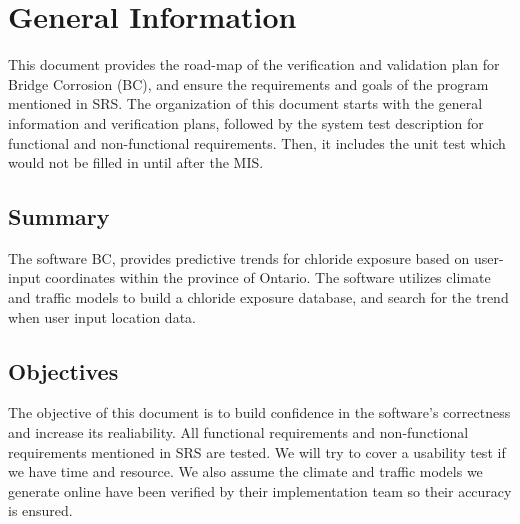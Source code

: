\documentclass[12pt, titlepage]{article}
\begin{document}


\newpage


\section{General Information}

This document provides the road-map of the verification and validation plan for Bridge Corrosion (BC), and ensure the requirements and goals of the program mentioned in SRS. The organization of this document starts with the general information and verification plans, followed by the system test description for functional and non-functional requirements. Then, it includes the unit test which would not be filled in until after the MIS.

\subsection{Summary}

The software BC, provides predictive trends for chloride exposure based on user-input coordinates within the province of Ontario. The software utilizes climate and traffic models to build a chloride exposure database, and search for the trend when user input location data.

\subsection{Objectives}
The objective of this document is to build confidence in the software's correctness and increase its realiability. All functional requirements and non-functional requirements mentioned in SRS are tested. We will try to cover a usability test if we have time and resource. We also assume the climate and traffic models we generate online have been verified by their implementation team so their accuracy is ensured.


\end{document}
